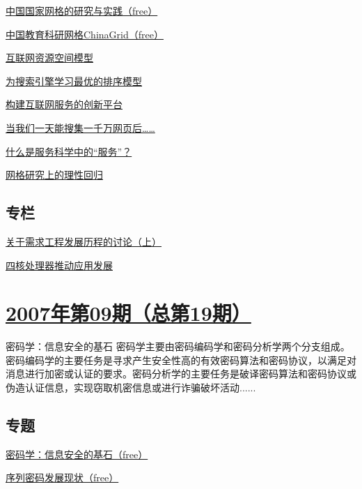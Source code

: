\documentclass[a4paper]{article}
\begin{document}
\href{http://history.ccf.org.cn/resources/1190201776262/2010/04/15/020018.pdf}{中国国家网格的研究与实践（free）}

\href{http://history.ccf.org.cn/resources/1190201776262/2010/04/15/020028.pdf}{中国教育科研网格ChinaGrid（free）}

\href{http://history.ccf.org.cn/resources/1190201776262/2010/04/15/020036.pdf}{互联网资源空间模型}

\href{http://history.ccf.org.cn/resources/1190201776262/2010/04/15/020041.pdf}{为搜索引擎学习最优的排序模型}

\href{http://history.ccf.org.cn/resources/1190201776262/2010/04/15/020046.pdf}{构建互联网服务的创新平台}

\href{http://history.ccf.org.cn/resources/1190201776262/2010/04/15/020052.pdf}{当我们一天能搜集一千万网页后……}

\href{http://history.ccf.org.cn/resources/1190201776262/2010/04/15/020058.pdf}{什么是服务科学中的“服务”？}

\href{http://history.ccf.org.cn/resources/1190201776262/2010/04/15/020063.pdf}{网格研究上的理性回归}

\subsection{专栏}
\href{http://history.ccf.org.cn/resources/1190201776262/2010/04/15/020066.pdf}{关于需求工程发展历程的讨论（上）}

\href{http://history.ccf.org.cn/resources/1190201776262/2010/04/15/020074.pdf}{四核处理器推动应用发展}


\section{\href{http://history.ccf.org.cn/sites/ccf/jsjtbbd.jsp?contentId=2542567628974}{\textbf{2007年第09期（总第19期）}}}
密码学：信息安全的基石 密码学主要由密码编码学和密码分析学两个分支组成。密码编码学的主要任务是寻求产生安全性高的有效密码算法和密码协议，以满足对消息进行加密或认证的要求。密码分析学的主要任务是破译密码算法和密码协议或伪造认证信息，实现窃取机密信息或进行诈骗破坏活动......
\subsection{专题}
\href{http://history.ccf.org.cn/resources/1190201776262/2010/04/15/019016.pdf}{密码学：信息安全的基石（free）}

\href{http://history.ccf.org.cn/resources/1190201776262/2010/04/15/019018.pdf}{序列密码发展现状（free）}
\end{document}
